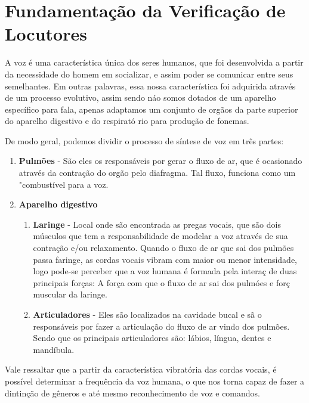 \documentclass[a4paper,12pt,twoside,openright]{report}
\begin{document}
\section{Fundamenta\c{c}\~{a}o da Verifica\c{c}\~{a}o de Locutores}
\label{secao_reconhecimento}
\par A voz \'{e} uma caracter\'{i}stica \'{u}nica dos seres humanos, que foi desenvolvida a partir da necessidade do homem em socializar, e assim poder se comunicar entre seus semelhantes. Em outras palavras, essa nossa caracter\'{i}stica foi adquirida atrav\'{e}s de um processo evolutivo, assim sendo n\'{a}o somos dotados de um aparelho espec\'{i}fico para fala, apenas adaptamos um conjunto de org\~{a}os da parte superior do aparelho digestivo e do respirat\'{o} rio para produ{\c c}\~{a}o de fonemas.

\par De modo geral, podemos dividir o processo de s\'{i}ntese de voz em tr\^{e}s partes: 

\begin{enumerate}
	\item \textbf{Pulm\~{o}es} - S\~{a}o eles os respons\'{a}veis por gerar o fluxo de ar, que \'{e} ocasionado atrav\'{e}s da contra{\c c}\~{a}o do org\~{a}o pelo diafragma. Tal fluxo, funciona como um "combust\'{i}vel para a voz.
	\item \textbf{Aparelho digestivo} 
	\begin{enumerate}
		\item{} \textbf{Laringe} - Local onde s\~{a}o encontrada as pregas vocais, que s\~{a}o dois m\'{u}sculos que tem a responsabilidade de modelar a voz atrav\'{e}s de sua contra{\c c}\~{a}o e/ou relaxamento. Quando o fluxo de ar que sai dos pulm\~{o}es passa faringe, as cordas vocais vibram com maior ou menor intensidade, logo pode-se perceber que a voz humana \'{e} formada pela intera{\c c} de duas principais for{\c c}as: A for{\c c}a com que o fluxo de ar sai dos pulm\'{o}es e for{\c c} muscular da laringe.
		\item{} \textbf{Articuladores} - Eles s\~{a}o localizados na cavidade bucal e s\~{a} o respons\'{a}veis por fazer a articula{\c c}\~{a}o do fluxo de ar vindo dos pulm\~{o}es. Sendo que os principais articuladores s\~{a}o: l\'{a}bios, l\'{i}ngua, dentes e mand\'{i}bula.
	\end{enumerate}
\end{enumerate}

\par Vale ressaltar que a partir da caracter\'{i}stica vibrat\'{o}ria das cordas vocais, \'{e} poss\'{i}vel determinar a frequ\^{e}ncia da voz humana, o que nos torna capaz de fazer a dintin{\c c}\~{a}o de g\^{e}neros e at\'{e} mesmo reconhecimento de voz e comandos.
\end{document}
